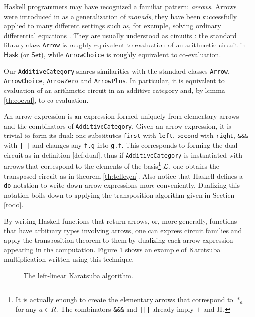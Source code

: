 Haskell programmers may have recognized a familiar pattern:
\emph{arrows}. Arrows were introduced in \cite{Hug00} as a
generalization of \emph{monads}, they have been successfully applied
to many different settings such as, for example, solving ordinary
differential equations \cite{LH10}. They are usually understood as
circuits \cite{Pat01}: the standard library class \lstinline+Arrow+ is
roughly equivalent to evaluation of an arithmetic circuit in
$\mathsf{Hask}$ (or $\mathsf{Set}$), while \lstinline+ArrowChoice+ is
roughly equivalent to co-evaluation.

Our \lstinline+AdditiveCategory+ shares similarities with the standard
classes \lstinline+Arrow+, \lstinline+ArrowChoice+,
\lstinline+ArrowZero+ and \lstinline+ArrowPlus+. In particular, it is
equivalent to evaluation of an arithmetic circuit in an additive
category and, by lemma \ref{th:coeval}, to co-evaluation.

An arrow expression is an expression formed uniquely from elementary
arrows and the combinators of \lstinline+AdditiveCategory+. Given an
arrow expression, it is trivial to form its dual: one substitutes
\lstinline|first| with \lstinline|left|, \lstinline|second| with
\lstinline|right|, \lstinline|&&&| with \lstinline&|||& and changes
any \lstinline|f.g| into \lstinline|g.f|. This corresponds to forming
the dual circuit as in definition \ref{def:dual}, thus if
\lstinline+AdditiveCategory+ is instantiated with arrows that
correspond to the elements of the basis\footnote{It is actually enough
  to create the elementary arrows that correspond to $*_a$ for any
  $a\in R$. The combinators \lstinline+&&&+ and \lstinline+|||+
  already imply $+$ and $\operatorname{H}$.} $\mathcal{L}$, one obtains the transposed
circuit as in theorem \ref{th:tellegen}. Also notice that Haskell
defines a \lstinline+do+-notation \cite{Pat01} to write down arrow
expressions more conveniently. Dualizing this notation boils down to
applying the transposition algorithm given in Section \ref{todo}.

By writing Haskell functions that return arrows, or, more generally,
functions that have arbitrary types involving arrows, one can express
circuit families and apply the transposition theorem to them by
dualizing each arrow expression appearing in the computation. Figure
\ref{fig:karahask} shows an example of Karatsuba multiplication
written using this technique.

\begin{figure}
  \centering
  
  \caption{The left-linear Karatsuba algorithm.}
  \label{fig:karahask}
\end{figure}


